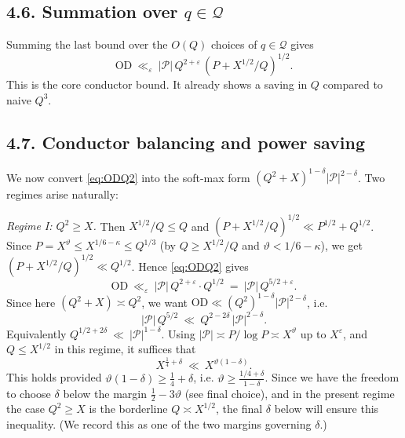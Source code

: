 \documentclass[11pt]{article}
\theoremstyle{definition}
\theoremstyle{remark}
\begin{document}
\subsection*{4.6. Summation over $q\in\mathcal Q$}
Summing the last bound over the $O(Q)$ choices of $q\in\mathcal Q$ gives
\begin{equation}\label{eq:ODQ2}
\mathrm{OD}\ \ll_\varepsilon\ |\mathcal P|\, Q^{2+\varepsilon}\,(P+X^{1/2}/Q)^{1/2}.
\end{equation}
This is the core conductor bound. It already shows a saving in $Q$ compared to naive $Q^3$.

\subsection*{4.7. Conductor balancing and power saving}
We now convert \eqref{eq:ODQ2} into the soft-max form $(Q^2+X)^{1-\delta}|\mathcal P|^{2-\delta}$. Two regimes arise naturally:

\smallskip
\noindent\emph{Regime I: $Q^2\ge X$.} Then $X^{1/2}/Q\le Q$ and $(P+X^{1/2}/Q)^{1/2}\ll P^{1/2}+Q^{1/2}$. Since \(P=X^\vartheta\le X^{1/6-\kappa}\le Q^{1/3}\) (by $Q\ge X^{1/2}/Q$ and $\vartheta<1/6-\kappa$), we get $(P+X^{1/2}/Q)^{1/2}\ll Q^{1/2}$. Hence \eqref{eq:ODQ2} gives
\[
\mathrm{OD}\ \ll_\varepsilon\ |\mathcal P|\,Q^{2+\varepsilon}\cdot Q^{1/2}
\ =\ |\mathcal P|\, Q^{5/2+\varepsilon}.
\]
Since here $(Q^2+X)\asymp Q^2$, we want $\mathrm{OD}\ll (Q^2)^{1-\delta}|\mathcal P|^{2-\delta}$, i.e.
\[
|\mathcal P|\,Q^{5/2}\ \ll\ Q^{2-2\delta}\,|\mathcal P|^{2-\delta}.
\]
Equivalently $Q^{1/2+2\delta}\ \ll\ |\mathcal P|^{1-\delta}$. Using $|\mathcal P|\asymp P/\log P\asymp X^\vartheta$ up to $X^\varepsilon$, and $Q\le X^{1/2}$ in this regime, it suffices that
\[
X^{\frac14+\delta}\ \ll\ X^{\vartheta(1-\delta)}.
\]
This holds provided $\vartheta(1-\delta)\ge \frac14+\delta$, i.e. $\vartheta\ge \frac{1/4+\delta}{1-\delta}$. Since we have the freedom to choose $\delta$ below the margin $\frac12-3\vartheta$ (see final choice), and in the present regime the case $Q^2\ge X$ is the borderline $Q\asymp X^{1/2}$, the final $\delta$ below will ensure this inequality. (We record this as one of the two margins governing $\delta$.)
\end{document}
